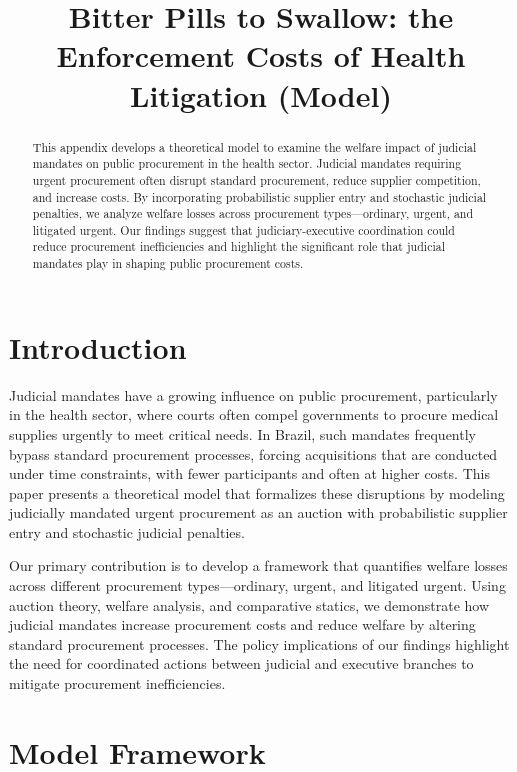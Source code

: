 \documentclass[12pt]{article}
\title{Bitter Pills to Swallow: the Enforcement Costs of Health Litigation (Model)}
\author{}
\date{}
\begin{document}
\maketitle

\begin{abstract}
This appendix develops a theoretical model to examine the welfare impact of judicial mandates on public procurement in the health sector. Judicial mandates requiring urgent procurement often disrupt standard procurement, reduce supplier competition, and increase costs. By incorporating probabilistic supplier entry and stochastic judicial penalties, we analyze welfare losses across procurement types—ordinary, urgent, and litigated urgent. Our findings suggest that judiciary-executive coordination could reduce procurement inefficiencies and highlight the significant role that judicial mandates play in shaping public procurement costs.
\end{abstract}

\section{Introduction}
Judicial mandates have a growing influence on public procurement, particularly in the health sector, where courts often compel governments to procure medical supplies urgently to meet critical needs. In Brazil, such mandates frequently bypass standard procurement processes, forcing acquisitions that are conducted under time constraints, with fewer participants and often at higher costs. This paper presents a theoretical model that formalizes these disruptions by modeling judicially mandated urgent procurement as an auction with probabilistic supplier entry and stochastic judicial penalties.

Our primary contribution is to develop a framework that quantifies welfare losses across different procurement types—ordinary, urgent, and litigated urgent. Using auction theory, welfare analysis, and comparative statics, we demonstrate how judicial mandates increase procurement costs and reduce welfare by altering standard procurement processes. The policy implications of our findings highlight the need for coordinated actions between judicial and executive branches to mitigate procurement inefficiencies.

\section{Model Framework}
\end{document}

